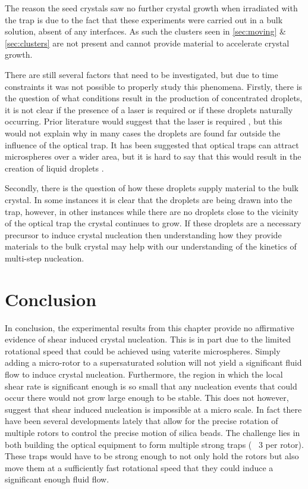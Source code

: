 The reason the seed crystals saw no further crystal growth when irradiated 
with the trap is due to the fact that these experiments were carried out 
in a bulk solution, absent of any interfaces. As such the clusters seen in
\ref{sec:moving} \& \ref{sec:clusters} are not present and cannot provide
material to accelerate crystal growth.

There are still several factors that need to be investigated, but due to time
constraints it was not possible to properly study this phenomena. Firstly, 
there is the question of what conditions result in the production of concentrated
droplets, it is not clear if the presence of a laser is required or if these
droplets naturally occurring. Prior literature would suggest that the laser is 
required \cite{Liao2022, Tsuboi2009}, but this would not explain why in many 
cases the droplets are found far outside the influence of the optical trap. It
has been suggested that optical traps can attract microspheres over a wider 
area, but it is hard to say that this would result in the creation of liquid 
droplets \cite{Yi2021}.

Secondly, there is the question of how these droplets supply material to the 
bulk crystal. In some instances it is clear that the droplets are being drawn 
into the trap, however, in other instances while there are no droplets close to
the vicinity of the optical trap the crystal continues to grow. If these droplets
are a necessary precursor to induce crystal nucleation then understanding how
they provide materials to the bulk crystal may help with our understanding of 
the kinetics of multi-step nucleation. 

\section{Conclusion}

In conclusion, the experimental results from this chapter provide no 
affirmative evidence of shear induced crystal nucleation. This is in
part due to the limited rotational speed that could be achieved using
vaterite microspheres. Simply adding a micro-rotor to a supersaturated
solution will not yield a significant fluid flow to induce crystal 
nucleation. Furthermore, the region in which the local shear rate is 
significant enough is so small that any nucleation events that could 
occur there would not grow large enough to be stable. This does not 
however, suggest that shear induced nucleation is impossible at a 
micro scale. In fact there have been several developments lately that
allow for the precise rotation of multiple rotors to control the 
precise motion of silica beads. The challenge lies in both building the
optical equipment to form multiple strong traps (~ 3 per rotor). These 
traps would have to be strong enough to not only hold the rotors but 
also move them at a sufficiently fast rotational speed that they could
induce a significant enough fluid flow. 

